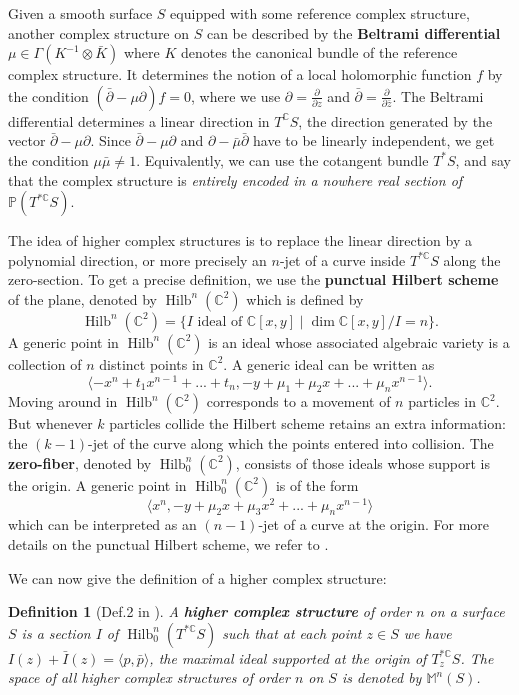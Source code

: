\documentclass[11pt]{amsart}
\newtheorem{definition}[thm]{Definition}
\numberwithin{thm}{section} %
\numberwithin{equation}{section} %
\numberwithin{figure}{section} %
\newcommand*{\C}{\mathbb{C}}
\newcommand*{\M}{\mathbb{M}}
\renewcommand*{\S}{S}
\newcommand*{\bb}{\mathbb}
\newcommand*{\del}{\partial}
\newcommand*{\delbar}{\bar\partial}
\DeclareMathOperator{\Hilb}{Hilb}
\begin{document}
Given a smooth surface $S$ equipped with some reference complex structure, another complex structure on $S$ can be described by the \textbf{Beltrami differential} $\mu\in\Gamma(K^{-1}\otimes \bar{K})$ where $K$ denotes the canonical bundle of the reference complex structure. It determines the notion of a local holomorphic function $f$ by the condition $(\delbar-\mu\del)f=0$, where we use $\partial=\tfrac{\partial}{\partial z}$ and $\bar\partial=\tfrac{\partial}{\partial \bar{z}}$. The Beltrami differential determines a linear direction in $T^{\C}\S$, the direction generated by the vector $\delbar-\mu\del$. Since $\delbar-\mu\del$ and $\del-\bar{\mu}\delbar$ have to be linearly independent, we get the condition $\mu\bar{\mu}\neq 1$.
Equivalently, we can use the cotangent bundle $T^*\S$, and say that the complex structure is \emph{entirely encoded in a nowhere real section of $\bb{P}(T^{*\C}\S)$}.

The idea of higher complex structures is to replace the linear direction by a polynomial direction, or more precisely an $n$-jet of a curve inside $T^{*\C}\S$ along the zero-section.
To get a precise definition, we use the \textbf{punctual Hilbert scheme} of the plane, denoted by $\Hilb^n(\C^2)$ which is defined by
$$\Hilb^n(\C^2)=\{I \text{ ideal of } \C[x,y] \mid \dim \C[x,y]/I = n\}.$$
A generic point in $\Hilb^n(\C^2)$ is an ideal whose associated algebraic variety is a collection of $n$ distinct points in $\C^2$. A generic ideal can be written as $$\langle-x^n+t_1x^{n-1}+...+t_n, -y+\mu_1+\mu_2x+...+\mu_nx^{n-1} \rangle.$$ Moving around in $\Hilb^n(\C^2)$ corresponds to a movement of $n$ particles in $\C^2$. But whenever $k$ particles collide the Hilbert scheme retains an extra information: the $(k-1)$-jet of the curve along which the points entered into collision. The \textbf{zero-fiber}, denoted by $\Hilb^n_0(\C^2)$, consists of those ideals whose support is the origin. A generic point in $\Hilb^n_0(\C^2)$ is of the form $$\langle x^n, -y+\mu_2x+\mu_3x^2+...+\mu_nx^{n-1}\rangle$$
which can be interpreted as an $(n-1)$-jet of a curve at the origin. For more details on the punctual Hilbert scheme, we refer to \cite[Appendix A]{g-complex}.

We can now give the definition of a higher complex structure:

\begin{definition}[Def.2 in \cite{FockThomas}]
 A \textbf{higher complex structure} of order $n$ on a surface $S$ is a section $I$ of $\Hilb^n_0(T^{*\mathbb{C}}S)$ such that at each point $z\in \S$ we have $I(z)+\bar{I}(z)=\langle p, \bar{p} \rangle$, the maximal ideal supported at the origin of $T_z^{*\mathbb{C}}S$. 
The space of all higher complex structures of order $n$ on $S$ is denoted by $\M^n(S)$.
\end{definition}
\end{document}

